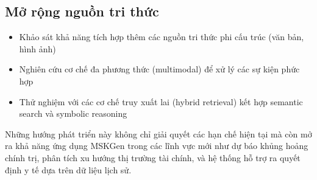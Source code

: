 \subsection{Mở rộng nguồn tri thức}
\begin{itemize}
\item Khảo sát khả năng tích hợp thêm các nguồn tri thức phi cấu trúc (văn bản, hình ảnh)
\item Nghiên cứu cơ chế đa phương thức (multimodal) để xử lý các sự kiện phức hợp
\item Thử nghiệm với các cơ chế truy xuất lai (hybrid retrieval) kết hợp semantic search và symbolic reasoning
\end{itemize}

Những hướng phát triển này không chỉ giải quyết các hạn chế hiện tại mà còn mở ra khả năng ứng dụng MSKGen trong các lĩnh vực mới như dự báo khủng hoảng chính trị, phân tích xu hướng thị trường tài chính, và hệ thống hỗ trợ ra quyết định y tế dựa trên dữ liệu lịch sử. 
